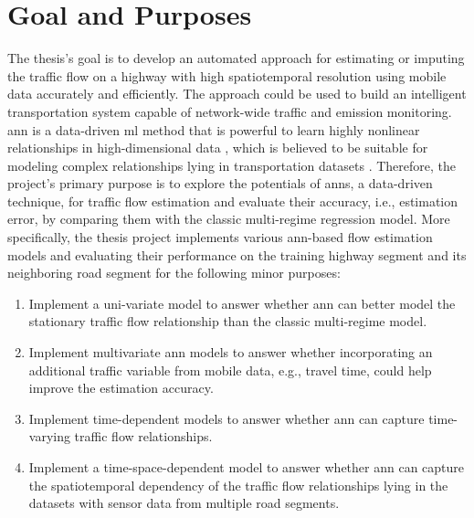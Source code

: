 \documentclass[english]{kththesis}
\begin{document}
\section{Goal and Purposes}
\label{sec:goalAndPurposes}
The thesis's goal is to develop an automated approach for estimating or imputing the traffic flow on a highway with high spatiotemporal resolution using mobile data accurately and efficiently. The approach could be used to build an intelligent transportation system capable of network-wide traffic and emission monitoring. \gls{ann} is a data-driven \gls{ml} method that is powerful to learn highly nonlinear relationships in high-dimensional data \cite{ma_lstm_predict}, which is believed to be suitable for modeling complex relationships lying in transportation datasets \cite{vlahogianni_forecast_overview}. Therefore, the project's primary purpose is to explore the potentials of \glspl{ann}, a data-driven technique, for traffic flow estimation and evaluate their accuracy, i.e., estimation error, by comparing them with the classic multi-regime regression model. More specifically, the thesis project implements various \gls{ann}-based flow estimation models and evaluating their performance on the training highway segment and its neighboring road segment for the following minor purposes:
\begin{enumerate}
    \item Implement a uni-variate model to answer whether \gls{ann} can better model the stationary traffic flow relationship than the classic multi-regime model.
    \item Implement multivariate \gls{ann} models to answer whether incorporating an additional traffic variable from mobile data, e.g., travel time, could help improve the estimation accuracy.
    \item Implement time-dependent models to answer whether \gls{ann} can capture time-varying traffic flow relationships.
    \item Implement a time-space-dependent model to answer whether \gls{ann} can capture the spatiotemporal dependency of the traffic flow relationships lying in the datasets with sensor data from multiple road segments.
\end{enumerate}
\end{document}
